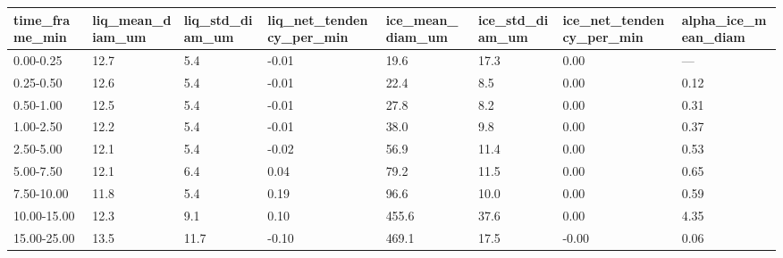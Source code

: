 \begin{tabular}{llllllll}
\toprule
time_frame_min & liq_mean_diam_um & liq_std_diam_um & liq_net_tendency_per_min & ice_mean_diam_um & ice_std_diam_um & ice_net_tendency_per_min & alpha_ice_mean_diam \\
\midrule
0.00-0.25 & 12.7 & 5.4 & -0.01 & 19.6 & 17.3 & 0.00 & — \\
0.25-0.50 & 12.6 & 5.4 & -0.01 & 22.4 & 8.5 & 0.00 & 0.12 \\
0.50-1.00 & 12.5 & 5.4 & -0.01 & 27.8 & 8.2 & 0.00 & 0.31 \\
1.00-2.50 & 12.2 & 5.4 & -0.01 & 38.0 & 9.8 & 0.00 & 0.37 \\
2.50-5.00 & 12.1 & 5.4 & -0.02 & 56.9 & 11.4 & 0.00 & 0.53 \\
5.00-7.50 & 12.1 & 6.4 & 0.04 & 79.2 & 11.5 & 0.00 & 0.65 \\
7.50-10.00 & 11.8 & 5.4 & 0.19 & 96.6 & 10.0 & 0.00 & 0.59 \\
10.00-15.00 & 12.3 & 9.1 & 0.10 & 455.6 & 37.6 & 0.00 & 4.35 \\
15.00-25.00 & 13.5 & 11.7 & -0.10 & 469.1 & 17.5 & -0.00 & 0.06 \\
\bottomrule
\end{tabular}
